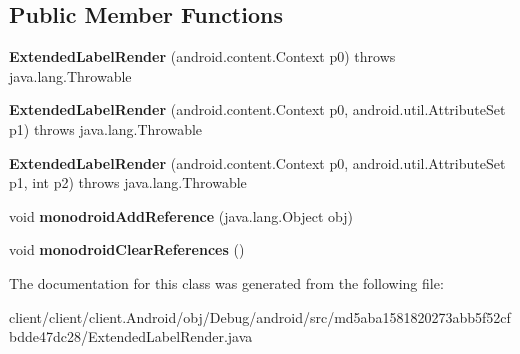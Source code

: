 \subsection*{Public Member Functions}
\begin{DoxyCompactItemize}
\item 
\hypertarget{classmd5aba1581820273abb5f52cfbdde47dc28_1_1ExtendedLabelRender_a2f7f650310ef93e83b752bf841bbf591}{}{\bfseries Extended\+Label\+Render} (android.\+content.\+Context p0)  throws java.\+lang.\+Throwable 	\label{classmd5aba1581820273abb5f52cfbdde47dc28_1_1ExtendedLabelRender_a2f7f650310ef93e83b752bf841bbf591}

\item 
\hypertarget{classmd5aba1581820273abb5f52cfbdde47dc28_1_1ExtendedLabelRender_ad9a1b2300b3fc320358c8c8d5efadf0b}{}{\bfseries Extended\+Label\+Render} (android.\+content.\+Context p0, android.\+util.\+Attribute\+Set p1)  throws java.\+lang.\+Throwable 	\label{classmd5aba1581820273abb5f52cfbdde47dc28_1_1ExtendedLabelRender_ad9a1b2300b3fc320358c8c8d5efadf0b}

\item 
\hypertarget{classmd5aba1581820273abb5f52cfbdde47dc28_1_1ExtendedLabelRender_a8c22571b536e5289e3df4174e99cc685}{}{\bfseries Extended\+Label\+Render} (android.\+content.\+Context p0, android.\+util.\+Attribute\+Set p1, int p2)  throws java.\+lang.\+Throwable 	\label{classmd5aba1581820273abb5f52cfbdde47dc28_1_1ExtendedLabelRender_a8c22571b536e5289e3df4174e99cc685}

\item 
\hypertarget{classmd5aba1581820273abb5f52cfbdde47dc28_1_1ExtendedLabelRender_a46b32b33d0873cc7a49c09e00fb82b42}{}void {\bfseries monodroid\+Add\+Reference} (java.\+lang.\+Object obj)\label{classmd5aba1581820273abb5f52cfbdde47dc28_1_1ExtendedLabelRender_a46b32b33d0873cc7a49c09e00fb82b42}

\item 
\hypertarget{classmd5aba1581820273abb5f52cfbdde47dc28_1_1ExtendedLabelRender_a89ae0de27f276aefd0dbc6a284009fb5}{}void {\bfseries monodroid\+Clear\+References} ()\label{classmd5aba1581820273abb5f52cfbdde47dc28_1_1ExtendedLabelRender_a89ae0de27f276aefd0dbc6a284009fb5}

\end{DoxyCompactItemize}


The documentation for this class was generated from the following file\+:\begin{DoxyCompactItemize}
\item 
client/client/client.\+Android/obj/\+Debug/android/src/md5aba1581820273abb5f52cfbdde47dc28/Extended\+Label\+Render.\+java\end{DoxyCompactItemize}
